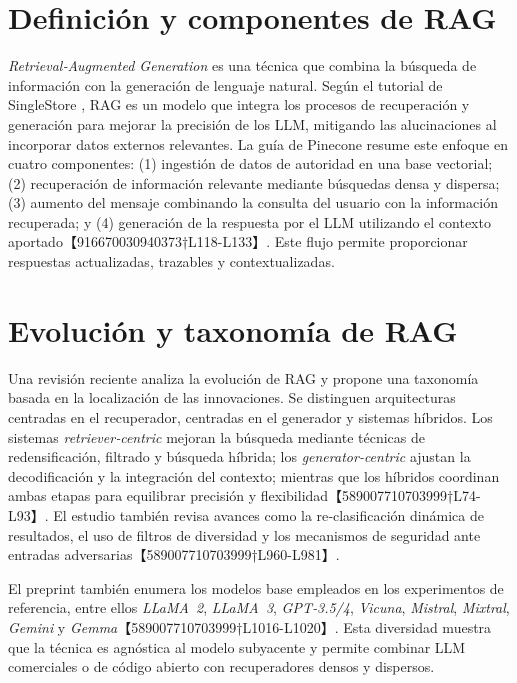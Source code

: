 \section{Definición y componentes de RAG}

\textit{Retrieval‑Augmented Generation} es una técnica que combina la búsqueda de información con la generación de lenguaje natural.  Según el tutorial de SingleStore \cite{singlestore2025tutorial}, RAG es un modelo que integra los procesos de recuperación y generación para mejorar la precisión de los LLM, mitigando las alucinaciones al incorporar datos externos relevantes.  La guía de Pinecone resume este enfoque en cuatro componentes: (1) ingestión de datos de autoridad en una base vectorial; (2) recuperación de información relevante mediante búsquedas densa y dispersa; (3) aumento del mensaje combinando la consulta del usuario con la información recuperada; y (4) generación de la respuesta por el LLM utilizando el contexto aportado【916670030940373†L118-L133】.  Este flujo permite proporcionar respuestas actualizadas, trazables y contextualizadas.

\section{Evolución y taxonomía de RAG}

Una revisión reciente \cite{sharma2025survey} analiza la evolución de RAG y propone una taxonomía basada en la localización de las innovaciones.  Se distinguen arquitecturas centradas en el recuperador, centradas en el generador y sistemas híbridos.  Los sistemas \emph{retriever‑centric} mejoran la búsqueda mediante técnicas de redensificación, filtrado y búsqueda híbrida; los \emph{generator‑centric} ajustan la decodificación y la integración del contexto; mientras que los híbridos coordinan ambas etapas para equilibrar precisión y flexibilidad【589007710703999†L74-L93】.  El estudio también revisa avances como la re‑clasificación dinámica de resultados, el uso de filtros de diversidad y los mecanismos de seguridad ante entradas adversarias【589007710703999†L960-L981】.

El preprint también enumera los modelos base empleados en los experimentos de referencia, entre ellos \textit{LLaMA 2}, \textit{LLaMA 3}, \textit{GPT‑3.5/4}, \textit{Vicuna}, \textit{Mistral}, \textit{Mixtral}, \textit{Gemini} y \textit{Gemma}【589007710703999†L1016-L1020】.  Esta diversidad muestra que la técnica es agnóstica al modelo subyacente y permite combinar LLM comerciales o de código abierto con recuperadores densos y dispersos.

